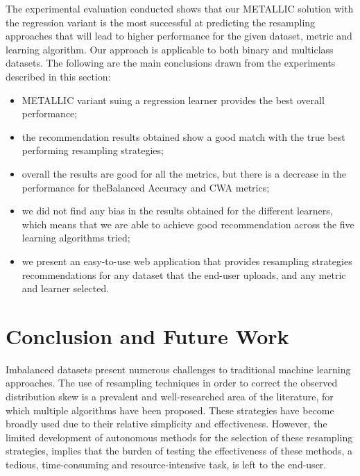 \documentclass{article}
\begin{document}
The experimental evaluation conducted shows that our METALLIC solution with the regression variant is the most successful at predicting the resampling approaches that will lead to higher performance for the given dataset, metric and learning algorithm. Our approach is applicable to both binary and multiclass datasets. The following are the main conclusions drawn from the experiments described in this section:

\begin{itemize}
    \item METALLIC variant suing a regression learner provides the best overall performance;
    \item the recommendation results obtained show a good match with the true best performing resampling strategies;
    \item overall the results are good for all the metrics, but there is a decrease in the performance for theBalanced Accuracy and CWA metrics;
    \item we did not find any bias in the results obtained for the different learners, which means that we are able to achieve good recommendation across the five learning algorithms tried;
    \item we present an easy-to-use web application that provides resampling strategies recommendations for any dataset that the end-user uploads, and any metric and learner selected.
\end{itemize}



\section{Conclusion and Future Work}\label{sec:conclusion}
Imbalanced datasets present numerous challenges to traditional machine learning approaches. The use of resampling techniques in order to correct the observed distribution skew is a prevalent and well-researched area of the literature, for which multiple algorithms have been proposed. These strategies have become broadly used due to their relative simplicity and effectiveness. However, the limited development of autonomous methods for the selection of these resampling strategies, implies that the burden of testing the effectiveness of these methods, a tedious, time-consuming and resource-intensive task, is left to the end-user. 
\end{document}
